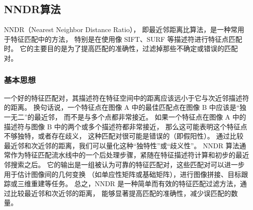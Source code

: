 
\subsection{NNDR算法}
NNDR（Nearest Neighbor Distance Ratio），
即最近邻距离比算法，是一种常用于特征匹配中的方法，
特别是在使用像 SIFT、SURF 等描述符进行特征点匹配时。
它的主要目的是为了提高匹配的准确性，过滤掉那些不确定或错误的匹配对。

\subsubsection{基本思想}
一个好的特征匹配对，其描述符在特征空间中的距离应该远小于它与次近邻描述符的距离。
换句话说，一个特征点在图像 A 中的最佳匹配点在图像 B 中应该是“独一无二”的最近邻，
而不是与多个点都非常接近。
如果一个特征点在图像 A 中的描述符与图像 B 中的两个或多个描述符都非常接近，
那么这可能表明这个特征点不够独特，或者存在歧义，
这种匹配对很可能是错误的（即假阳性）。
通过比较最近邻和次近邻的距离，我们可以量化这种“独特性”或“歧义性”。
NNDR 算法通常作为特征匹配流水线中的一个后处理步骤，紧随在特征描述符计算和初步的最近邻搜索之后。
它的输出是一组被认为可靠的特征匹配对，这些匹配对可以进一步用于估计图像间的几何变换
（如单应性矩阵或基础矩阵），进行图像拼接、目标跟踪或三维重建等任务。
总之，NNDR 是一种简单而有效的特征匹配过滤方法，通过比较最近邻和次近邻的距离，
能够显著提高匹配的准确性，减少误匹配的数量。
